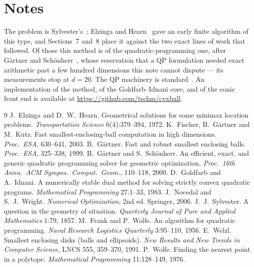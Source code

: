\documentclass[10pt,a4paper]{article}
\theoremstyle{plain}
\theoremstyle{remark}
\begin{document}
\section{Notes}

The problem is Sylvester's~\cite{sylvester1857}; Elzinga and
Hearn~\cite{elzinga1972} gave an early finite algorithm of this type, and
Sections~7 and~8 place it against the two exact lines of work that followed. Of
those this method is of the quadratic-programming one, after G\"artner and
Sch\"onherr~\cite{gaertner2000}, whose reservation that a QP formulation needed
exact arithmetic past a few hundred dimensions this note cannot dispute --- its
measurements stop at $d=20$. The QP machinery is standard~\cite{nocedal2006}. An
implementation of the method, of the Goldfarb--Idnani core, and of the conic
front end is available at \url{https://github.com/tschm/cvxball}.

\begin{thebibliography}{9}
\footnotesize
\setlength{\itemsep}{1pt}
\setlength{\parskip}{0pt}
 J.~Elzinga and D.~W.~Hearn. Geometrical solutions for some
  minimax location problems. \emph{Transportation Science} 6(4):379--394, 1972.
 K.~Fischer, B.~G\"artner and M.~Kutz. Fast
  smallest-enclosing-ball computation in high dimensions. \emph{Proc.\ ESA},
  630--641, 2003.
 B.~G\"artner. Fast and robust smallest enclosing balls.
  \emph{Proc.\ ESA}, 325--338, 1999.
 B.~G\"artner and S.~Sch\"onherr. An efficient, exact,
  and generic quadratic programming solver for geometric optimization.
  \emph{Proc.\ 16th Annu.\ ACM Sympos.\ Comput.\ Geom.}, 110--118, 2000.
 D.~Goldfarb and A.~Idnani. A numerically stable dual
  method for solving strictly convex quadratic programs. \emph{Mathematical
  Programming} 27:1--33, 1983.
 J.~Nocedal and S.~J.~Wright. \emph{Numerical
  Optimization}, 2nd ed. Springer, 2006.
 J.~J.~Sylvester. A question in the geometry of
  situation. \emph{Quarterly Journal of Pure and Applied Mathematics} 1:79, 1857.
 M.~Frank and P.~Wolfe. An algorithm for quadratic
  programming. \emph{Naval Research Logistics Quarterly} 3:95--110, 1956.
 E.~Welzl. Smallest enclosing disks (balls and ellipsoids).
  \emph{New Results and New Trends in Computer Science}, LNCS 555, 359--370, 1991.
 P.~Wolfe. Finding the nearest point in a polytope.
  \emph{Mathematical Programming} 11:128--149, 1976.
\end{thebibliography}
\end{document}
